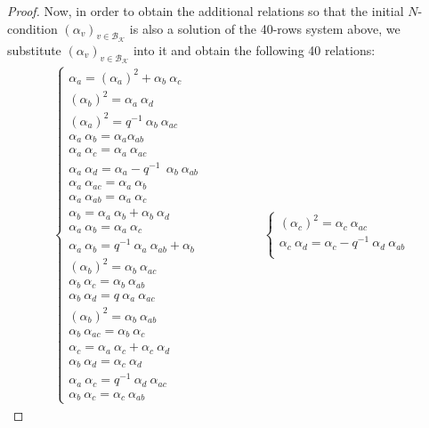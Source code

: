 \documentclass[reqno]{amsart}
\theoremstyle{definition}
\numberwithin{equation}{section}\theoremstyle{plain}
\newcommand{\B}{\mathcal{B}}
\theoremstyle{definition}
\def \K {\mathcal{K}}
\begin{document}
\begin{proof}
Now, in order to obtain the additional relations so that the initial $N$-condition $(\alpha_v)_{v \in \B_\K}$ is also a solution of the 40-rows system above, we substitute $(\alpha_v)_{v \in \B_\K}$ into it and obtain the following 40 relations:
\begin{align}\label{sist_K}
\left\{
\begin{array}{lll}
\alpha_a  = (\alpha_{a})^2 + \alpha_{b} \ \alpha_{c} \\
(\alpha_{b})^2 = \alpha_{a} \ \alpha_{d} \\
(\alpha_{a})^2 = q^{-1} \ \alpha_b  \ \alpha_{ac}\\
\alpha_{a} \ \alpha_{b} = \alpha_{a} \alpha_{ab} \\
\alpha_a \ \alpha_{c} = \alpha_a \ \alpha_{ac} \\
\alpha_a \ \alpha_{d} = \alpha_{a} - q^{-1} \ \ \alpha_{b} \ \alpha_{ab} \\
\alpha_a \ \alpha_{ac} = \alpha_{a} \ \alpha_{b} \\
\alpha_a \ \alpha_{ab} = \alpha_{a} \ \alpha_c \\
\alpha_{b} = \alpha_{a} \ \alpha_{b} + \alpha_{b} \ \alpha_{d} \\
\alpha_{a} \ \alpha_{b} = \alpha_{a} \ \alpha_{c}\\
\alpha_{a} \ \alpha_{b} = q^{-1} \ \alpha_{a} \ \alpha_{ab} + \alpha_{b} \\
(\alpha_{b})^2 = \alpha_{b} \ \alpha_{ac} \\
\alpha_{b} \ \alpha_{c} = \alpha_{b} \ \alpha_{ab} \\
\alpha_{b} \ \alpha_{d} = q \ \alpha_{a} \ \alpha_{ac} \\
(\alpha_{b})^2 = \alpha_{b} \ \alpha_{ab} \\
\alpha_{b} \ \alpha_{ac} = \alpha_{b} \ \alpha_{c}\\
\alpha_{c} = \alpha_{a} \ \alpha_{c} + \alpha_{c} \ \alpha_{d} \\
\alpha_{b} \ \alpha_{d} = \alpha_{c} \ \alpha_{d} \\
\alpha_{a} \ \alpha_{c} = q^{-1} \ \alpha_{d} \ \alpha_{ac} \\
\alpha_{b} \ \alpha_{c} = \alpha_{c} \ \alpha_{ab}
\end{array} 
\right. & \qquad \qquad
\left\{
\begin{array}{lll}
(\alpha_{c})^2 = \alpha_{c} \ \alpha_{ac} \\
\alpha_{c} \ \alpha_{d} = \alpha_{c} - q^{-1} \ \alpha_{d} \ \alpha_{ab} \\

\end{array}
\end{align}
\end{proof}
\end{document}
